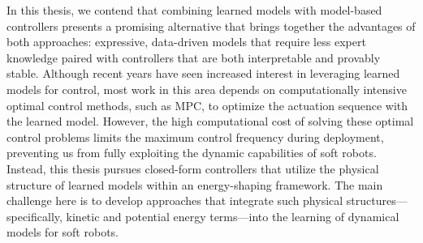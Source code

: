 
In this thesis, we contend that combining learned models with model-based controllers presents a promising alternative that brings together the advantages of both approaches: expressive, data-driven models that require less expert knowledge paired with controllers that are both interpretable and provably stable. Although recent years have seen increased interest in leveraging learned models for control, most work in this area depends on computationally intensive optimal control methods, such as \gls{MPC}, to optimize the actuation sequence with the learned model. However, the high computational cost of solving these optimal control problems limits the maximum control frequency during deployment, preventing us from fully exploiting the dynamic capabilities of soft robots. Instead, this thesis pursues closed-form controllers that utilize the physical structure of learned models within an energy-shaping framework. The main challenge here is to develop approaches that integrate such physical structures—specifically, kinetic and potential energy terms—into the learning of dynamical models for soft robots.
